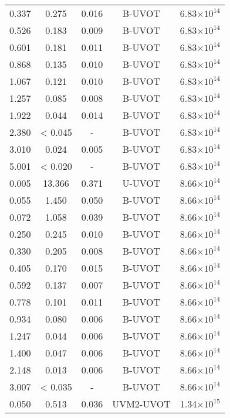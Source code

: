 \documentclass{aa}
\begin{document}
{\begin{longtable}{c|c|c|c|c}
  0.337 &   0.275 &  0.016 & B-UVOT    &  6.83$\times 10^{14}$    \\
  0.526 &   0.183 &  0.009 & B-UVOT    &  6.83$\times 10^{14}$    \\
  0.601 &   0.181 &  0.011 & B-UVOT    &  6.83$\times 10^{14}$    \\
  0.868 &   0.135 &  0.010 & B-UVOT    &  6.83$\times 10^{14}$    \\
  1.067 &   0.121 &  0.010 & B-UVOT    &  6.83$\times 10^{14}$    \\
  1.257 &   0.085 &  0.008 & B-UVOT    &  6.83$\times 10^{14}$    \\
  1.922 &   0.044 &  0.014 & B-UVOT    &  6.83$\times 10^{14}$    \\
  2.380 & < 0.045 &  -     & B-UVOT    &  6.83$\times 10^{14}$    \\
  3.010 &   0.024 &  0.005 & B-UVOT    &  6.83$\times 10^{14}$    \\
  5.001 & < 0.020 &  -     & B-UVOT    &  6.83$\times 10^{14}$    \\
  0.005 &  13.366 &  0.371 & U-UVOT    &  8.66$\times 10^{14}$    \\
  0.055 &   1.450 &  0.050 & B-UVOT    &  8.66$\times 10^{14}$    \\
  0.072 &   1.058 &  0.039 & B-UVOT    &  8.66$\times 10^{14}$    \\
  0.250 &   0.245 &  0.010 & B-UVOT    &  8.66$\times 10^{14}$    \\
  0.330 &   0.205 &  0.008 & B-UVOT    &  8.66$\times 10^{14}$    \\
  0.405 &   0.170 &  0.015 & B-UVOT    &  8.66$\times 10^{14}$    \\
  0.592 &   0.137 &  0.007 & B-UVOT    &  8.66$\times 10^{14}$    \\
  0.778 &   0.101 &  0.011 & B-UVOT    &  8.66$\times 10^{14}$    \\
  0.934 &   0.080 &  0.006 & B-UVOT    &  8.66$\times 10^{14}$    \\
  1.247 &   0.044 &  0.006 & B-UVOT    &  8.66$\times 10^{14}$    \\
  1.400 &   0.047 &  0.006 & B-UVOT    &  8.66$\times 10^{14}$    \\
  2.148 &   0.013 &  0.006 & B-UVOT    &  8.66$\times 10^{14}$    \\
  3.007 & < 0.035 &  -     & B-UVOT    &  8.66$\times 10^{14}$    \\
  0.050 &   0.513 &  0.036 & UVM2-UVOT &  1.34$\times 10^{15}$    \\

\end{longtable}}
\end{document}
